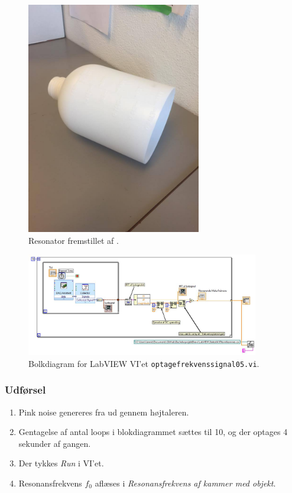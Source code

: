 {	\begin{figure}
	\centering
	\includegraphics[width=3in]{resonator.jpg}
	\caption{Resonator fremstillet af .}
	\label{fig:resonator}	
	\end{figure}

	\begin{figure}
	\centering
	\includegraphics[width=4in]{optagefrekvenssignal05.jpeg}
	\caption{Bolkdiagram for LabVIEW VI'et \texttt{optagefrekvenssignal05.vi}.}
	\label{fig:optagefrekvenssignal05}	
	\end{figure}
	
	\subsubsection{Udførsel}
			
			\begin{enumerate}
			\item Pink noise genereres fra \onlineg  ud gennem højtaleren. 
			\item Gentagelse af antal loops i blokdiagrammet sættes til 10, og der optages 4 sekunder af gangen. 
			\item Der tykkes \textit{Run} i VI'et. 
			\item Resonansfrekvens $f_{0}$ aflæses i \textit{Resonansfrekvens af kammer med objekt}.
			\end{enumerate}
			
}
